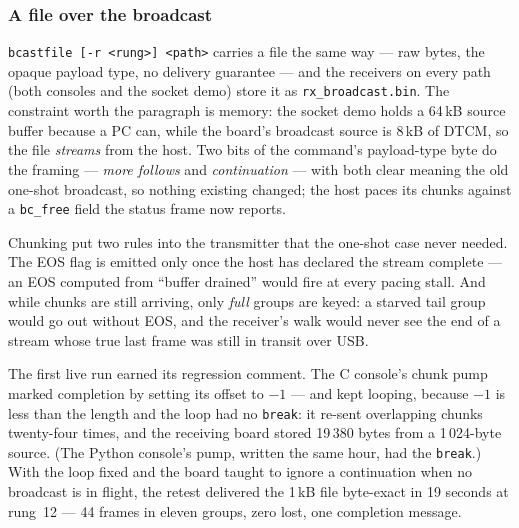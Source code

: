 \subsubsection{A file over the broadcast}

\texttt{bcastfile [-r <rung>] <path>} carries a file the same way ---
raw bytes, the opaque payload type, no delivery guarantee --- and the
receivers on every path (both consoles and the socket demo) store it
as \texttt{rx\_broadcast.bin}. The constraint worth the paragraph is
memory: the socket demo holds a 64\,kB source buffer because a PC
can, while the board's broadcast source is 8\,kB of DTCM, so the file
\emph{streams} from the host. Two bits of the command's payload-type
byte do the framing --- \emph{more follows} and \emph{continuation}
--- with both clear meaning the old one-shot broadcast, so nothing
existing changed; the host paces its chunks against a
\texttt{bc\_free} field the status frame now reports.

Chunking put two rules into the transmitter that the one-shot case
never needed. The EOS flag is emitted only once the host has declared
the stream complete --- an EOS computed from ``buffer drained'' would
fire at every pacing stall. And while chunks are still arriving, only
\emph{full} groups are keyed: a starved tail group would go out
without EOS, and the receiver's walk would never see the end of a
stream whose true last frame was still in transit over USB.

The first live run earned its regression comment. The C console's
chunk pump marked completion by setting its offset to $-1$ --- and
kept looping, because $-1$ is less than the length and the loop had no
\texttt{break}: it re-sent overlapping chunks twenty-four times, and
the receiving board stored 19\,380 bytes from a 1\,024-byte source.
(The Python console's pump, written the same hour, had the
\texttt{break}.) With the loop fixed and the board taught to ignore a
continuation when no broadcast is in flight, the retest delivered the
1\,kB file byte-exact in 19 seconds at rung~12 --- 44 frames in
eleven groups, zero lost, one completion message.

